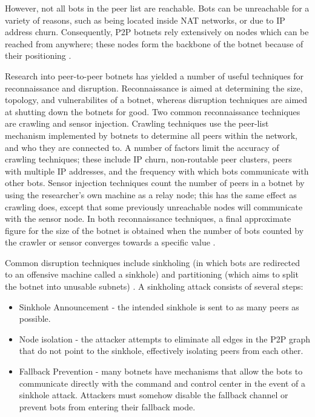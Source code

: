 \documentclass{acm_proc_article-sp}
\begin{document}
However, not all bots in the peer list are reachable.  Bots can be unreachable for a variety of reasons, such as being located inside NAT networks, or due to IP address churn.   Consequently, P2P botnets rely extensively on nodes which can be reached from anywhere; these nodes form the backbone of the botnet because of their positioning \cite{defcon:prowling}.

Research into peer-to-peer botnets has yielded a number of useful techniques for reconnaissance and disruption.  Reconnaissance is aimed at determining the size, topology, and vulnerabilites of a botnet, whereas disruption techniques are aimed at shutting down the botnets for good.  Two common reconnaissance techniques are crawling and sensor injection.  Crawling techniques use the peer-list mechanism implemented by botnets to determine all peers within the network, and who they are connected to. A number of factors limit the accuracy of crawling techniques; these include IP churn, non-routable peer clusters, peers with multiple IP addresses, and the frequency with which bots communicate with other bots.  Sensor injection techniques count the number of peers in a botnet by using the researcher’s own machine as a relay node; this has the same effect as crawling does, except that some previously unreachable nodes will communicate with the sensor node.  In both reconnaissance techniques, a final approximate figure for the size of the botnet is obtained when the number of bots counted by the crawler or sensor converges towards a specific value \cite{stone:p2p}\cite{defcon:prowling}.

Common disruption techniques include sinkholing (in which bots are redirected to an offensive machine called a sinkhole) and partitioning (which aims to split the botnet into unusable subnets) \cite{stone:p2p}.  A sinkholing attack consists of several steps:
\begin{itemize}
\item Sinkhole Announcement - the intended sinkhole is sent to as many peers as possible.
\item Node isolation - the attacker attempts to eliminate all edges in the P2P graph that do not point to the sinkhole, effectively isolating peers from each other.
\item Fallback Prevention - many botnets have mechanisms that allow the bots to communicate directly with the command and control center in the event of a sinkhole attack.  Attackers must somehow disable the fallback channel or prevent bots from entering their fallback mode.
\end{itemize}
\end{document}
